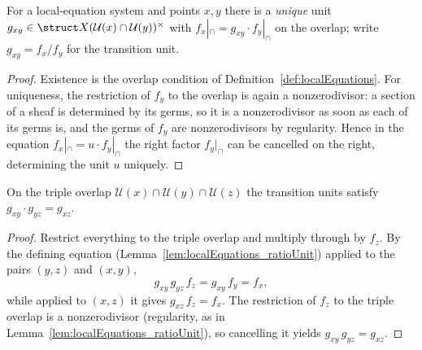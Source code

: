 \begin{lemma}
  \label{lem:localEquations_ratioUnit}
  \leanok
  For a local-equation system and points \(x, y\) there is a \emph{unique} unit \(g_{xy} \in
  \struct X(\mathcal U(x) \cap \mathcal U(y))^{\times}\) with \(f_x|_{\cap} = g_{xy} \cdot
  f_y|_{\cap}\) on the overlap; write \(g_{xy} = f_x/f_y\) for the transition unit.
\end{lemma}
\begin{proof}
  \leanok
  Existence is the overlap condition of Definition~\ref{def:localEquations}. For uniqueness, the
  restriction of \(f_y\) to the overlap is again a nonzerodivisor: a section of a sheaf is
  determined by its germs, so it is a nonzerodivisor as soon as each of its germs is, and the germs
  of \(f_y\) are nonzerodivisors by regularity. Hence in the equation \(f_x|_{\cap} = u \cdot
  f_y|_{\cap}\) the right factor \(f_y|_{\cap}\) can be cancelled on the right, determining the unit
  \(u\) uniquely.
\end{proof}

\begin{lemma}
  \label{lem:localEquations_cocycle}
  \leanok
  On the triple overlap \(\mathcal U(x) \cap \mathcal U(y) \cap \mathcal U(z)\) the transition
  units satisfy \(g_{xy} \cdot g_{yz} = g_{xz}\).
\end{lemma}
\begin{proof}
  \leanok
  Restrict everything to the triple overlap and multiply through by \(f_z\). By the defining
  equation (Lemma~\ref{lem:localEquations_ratioUnit}) applied to the pairs \((y,z)\) and \((x,y)\),
  \[
    g_{xy}\, g_{yz}\, f_z = g_{xy}\, f_y = f_x ,
  \]
  while applied to \((x,z)\) it gives \(g_{xz}\, f_z = f_x\). The restriction of \(f_z\) to the
  triple overlap is a nonzerodivisor (regularity, as in
  Lemma~\ref{lem:localEquations_ratioUnit}), so cancelling it yields \(g_{xy}\, g_{yz} = g_{xz}\).
\end{proof}

